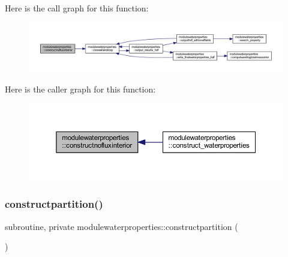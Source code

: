 Here is the call graph for this function\+:\nopagebreak
\begin{figure}[H]
\begin{center}
\leavevmode
\includegraphics[width=350pt]{namespacemodulewaterproperties_a1cee571ebf44f0252603c9bd29a100e1_cgraph}
\end{center}
\end{figure}
Here is the caller graph for this function\+:\nopagebreak
\begin{figure}[H]
\begin{center}
\leavevmode
\includegraphics[width=350pt]{namespacemodulewaterproperties_a1cee571ebf44f0252603c9bd29a100e1_icgraph}
\end{center}
\end{figure}
\mbox{\label{namespacemodulewaterproperties_ac9b1f4e5840ee5c5f36ff7bee993386b}} 
\subsubsection{\texorpdfstring{constructpartition()}{constructpartition()}}
{\footnotesize\ttfamily subroutine, private modulewaterproperties\+::constructpartition (\begin{DoxyParamCaption}{ }\end{DoxyParamCaption})\hspace{0.3cm}{\ttfamily [private]}}

